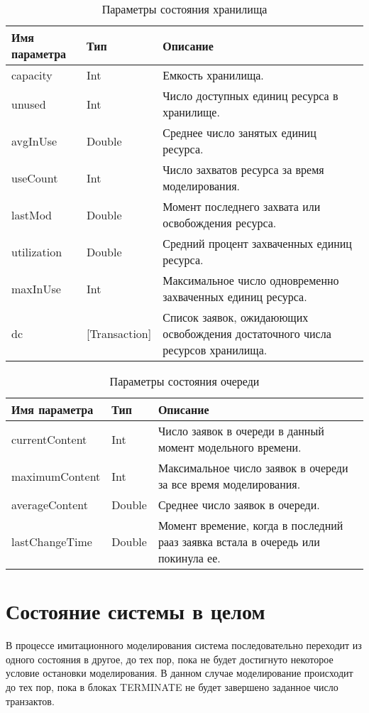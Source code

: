 \begin{table}
\caption{Параметры состояния хранилища}
\label{tab:storState}
\begin{tabular}{|l|l|p{}|}
\hline
Имя параметра & Тип & Описание \\
\hline
capacity & Int & Емкость хранилища.\\
\hline
unused & Int & Число доступных единиц ресурса в хранилище.\\
\hline
avgInUse & Double & Среднее число занятых единиц ресурса.\\
\hline
useCount & Int & Число захватов ресурса за время моделирования.\\
\hline
lastMod & Double & Момент последнего захвата или освобождения ресурса.\\
\hline
utilization & Double &Средний процент захваченных единиц ресурса.\\
\hline
maxInUse & Int & Максимальное число одновременно захваченных единиц ресурса. \\
\hline
dc & [Transaction] & Список заявок, ожидаюющих освобождения достаточного числа ресурсов хранилища. \\
\hline
\end{tabular}
\end{table}


\begin{table}
\caption{Параметры состояния очереди}
\label{tab:queueState}
\begin{tabular}{|l|l|p{}|}
\hline
Имя параметра & Тип & Описание \\
\hline
currentContent & Int & Число заявок в очереди в данный момент модельного времени.\\
\hline
maximumContent & Int & Максимальное число заявок в очереди за все время моделирования.\\
\hline
averageContent & Double & Среднее число заявок в очереди.\\
\hline
lastChangeTime & Double & Момент времение, когда в последний рааз заявка встала в очередь или покинула ее.\\
\hline
\end{tabular}
\end{table}


\section{Состояние системы в целом}

В процессе имитационного моделирования система последовательно переходит из одного состояния в другое, до тех пор, пока не будет достигнуто некоторое условие остановки моделирования. В данном случае моделирование происходит до тех пор, пока в блоках TERMINATE не будет завершено заданное число транзактов.

